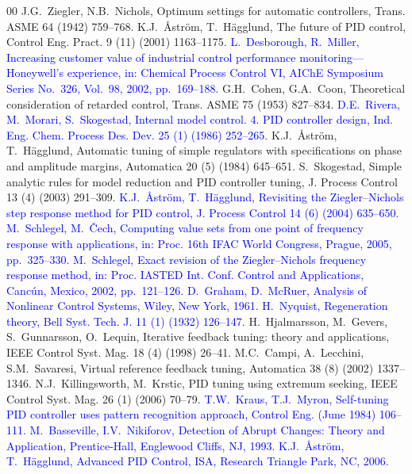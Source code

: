 \documentclass[final,3p,times,twocolumn]{elsarticle}
\newcommand{\rev}[1]{\textcolor{blue}{#1}}  %
\newcommand{\revf}[1]{\textcolor{blue}{#1}} %
\newcommand{\revh}[1]{\textcolor{blue}{#1}} %
\begin{document}

\begin{thebibliography}{00}
 J.G.~Ziegler, N.B.~Nichols, Optimum settings for
automatic controllers, Trans. ASME 64 (1942) 759--768.
 K.J.~\r{A}str\"om, T.~H\"agglund, The future
of PID control, Control Eng. Pract. 9 (11) (2001) 1163--1175.
 \revf{L.~Desborough, R.~Miller, Increasing
customer value of industrial control performance
monitoring---Honeywell's experience, in: Chemical Process Control VI,
AIChE Symposium Series No.~326, Vol.~98, 2002, pp.~169--188.}
 G.H.~Cohen, G.A.~Coon, Theoretical consideration
of retarded control, Trans. ASME 75 (1953) 827--834.
 \revf{D.E.~Rivera, M.~Morari, S.~Skogestad, Internal
model control. 4. PID controller design, Ind. Eng. Chem. Process Des.
Dev. 25 (1) (1986) 252--265.}
 K.J.~\r{A}str\"om, T.~H\"agglund, Automatic
tuning of simple regulators with specifications on phase and amplitude
margins, Automatica 20 (5) (1984) 645--651.
 S.~Skogestad, Simple analytic rules for model
reduction and PID controller tuning, J. Process Control 13 (4) (2003)
291--309.
 \rev{K.J.~\r{A}str\"om, T.~H\"agglund,
Revisiting the Ziegler--Nichols step response method for PID control,
J. Process Control 14 (6) (2004) 635--650.}
 \rev{M.~Schlegel, M.~\v{C}ech, Computing value
sets from one point of frequency response with applications, in: Proc.
16th IFAC World Congress, Prague, 2005, pp.~325--330.}
 \revf{M.~Schlegel, Exact revision of the
Ziegler--Nichols frequency response method, in: Proc. IASTED Int. Conf.
Control and Applications, Canc\'un, Mexico, 2002, pp.~121--126.}
 \revf{D.~Graham, D.~McRuer, Analysis of
Nonlinear Control Systems, Wiley, New York, 1961.}
 \revh{H.~Nyquist, Regeneration theory, Bell Syst.
Tech. J. 11 (1) (1932) 126--147.}
 H.~Hjalmarsson, M.~Gevers, S.~Gunnarsson,
O.~Lequin, Iterative feedback tuning: theory and applications, IEEE
Control Syst. Mag. 18 (4) (1998) 26--41.
 M.C.~Campi, A.~Lecchini, S.M.~Savaresi, Virtual
reference feedback tuning, Automatica 38 (8) (2002) 1337--1346.
 N.J.~Killingsworth, M.~Krstic, PID tuning
using extremum seeking, IEEE Control Syst. Mag. 26 (1) (2006) 70--79.
 \revh{T.W.~Kraus, T.J.~Myron, Self-tuning PID
controller uses pattern recognition approach, Control Eng. (June 1984)
106--111.}
 \revh{M.~Basseville, I.V.~Nikiforov,
Detection of Abrupt Changes: Theory and Application, Prentice-Hall,
Englewood Cliffs, NJ, 1993.}
 \revh{K.J.~\r{A}str\"om, T.~H\"agglund,
Advanced PID Control, ISA, Research Triangle Park, NC, 2006.}
\end{thebibliography}
\end{document}
